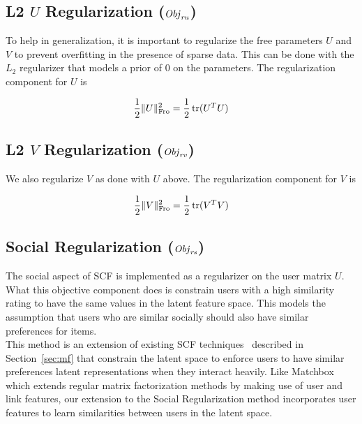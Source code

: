 \subsection{L2 $U$ Regularization ($\mathit{Obj}_{\mathit{ru}}$)}

To help in generalization, it is important to regularize the free parameters $U$ and $V$ to prevent overfitting in
the presence of sparse data. This can be done with the
$L_2$ regularizer that models a prior of $0$ on the parameters. The regularization component for $U$ is

\begin{align}
\frac{1}{2} \| U \|_{\mathrm{Fro}}^2 = \frac{1}{2} \operatorname{tr}(U^T U)
\end{align}

\subsection{L2 $V$ Regularization ($\mathit{Obj}_{\mathit{rv}}$)}

We also regularize $V$ as done with $U$ above. The regularization component for $V$ is

\begin{align}
\frac{1}{2} \| V \|_{\mathrm{Fro}}^2 = \frac{1}{2} \operatorname{tr}(V^T V)
\end{align}

\subsection{Social Regularization ($\mathit{Obj}_{\mathit{rs}}$)}
\label{sec:SocRec}
The social aspect of SCF is implemented as a regularizer on the user matrix $U$. What this objective component does is constrain users with a high similarity rating to have the same values in the latent feature space. This models the assumption that users who are similar socially should also have similar preferences for items.
\\

This method is an extension of existing SCF techniques~\cite{lla,socinf} described in Section~\ref{sec:mf} that constrain the latent space to enforce users  to have similar preferences latent representations when they interact heavily. Like Matchbox which extends regular matrix factorization methods by making use of user and link features, our extension to the Social Regularization method incorporates user features to learn similarities between users in the latent space.


